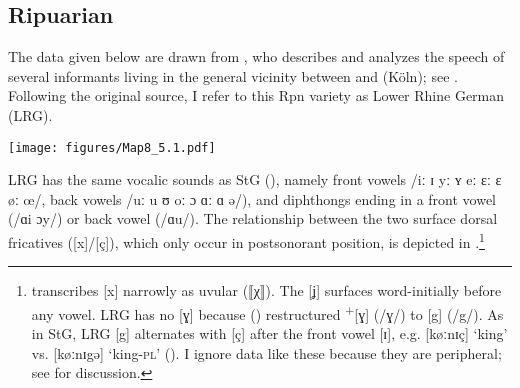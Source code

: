 \subsection{Ripuarian}\label{sec:5.3.1}

The data given below are drawn from \citet{Hall1993}, who describes and analyzes the speech of several informants living in the general vicinity between  and  (Köln); see . Following the original source, I refer to this Rpn variety as Lower Rhine German (LRG).

\begin{map}
 \centering\texttt{[image: figures/Map8\_5.1.pdf]}
 \caption[Ripuarian and Low Franconian]{Ripuarian (Rpn) and Low Franconian (LFr). Squares indicate postsonorant velar fronting and circles the absence of postsonorant velar fronting. 1=\citet{Rovenhagen1860}, 2=\citet{Wahlenberg1877},  3=\citet{Röttsches1877}, 4=\citet{Koch1879}, 5=\citet{Holthausen1885}, 6=\citet{Holthaus1887}, 7=\citet{Maurmann1889},  8=\citet{Jardon1891}, 9=\citet{Schmitz1893},  10=\citet{Müller1900}, 11=\citet{Münch1904}, 12=\citet{Hasenclever1905}, 13=\citet{Müller1912}, 14=\citet{Frings1913}, 15=\citet{Lobbes1915}, 16=\citet{Grass1920}, 17=\citet{Zeck1921},  18=\citet{Greferath1922}, 19=\citet{Mackenbach1924}, 20=\citet{Branscheid1927} (), 21=\citet{Branscheid1927} (), 22=\citet{Welter1929}, 23=\citet{Welter1933}, 24=\citet{Bubner1935}, 25=\citet{Welter1938}, 26=\citet{Heike1964}, 27=\citet{Heike1970}, 28=\citet{Jongen1972}, 29=\citet{Hecker1972}, 30=\citet{Heinrichs1978}, 31=\citet{CajotBeckers1979}, 32=\citet{Bister-Broosen1989}, 33--42=\citet{CornelissenEtAl1989} (Euskirchen (33), Dahlem (34), Monschau (35), Zülpich (36), Langerwehe (37), Nörvenich (38), Jülich (39), Bonn (40), Mönchengladbach (41), Heinsberg (42)), 43=\citet{Hinskens1992}, 44=\citet{Hall1993}, 45=\citet{Kreymann1994}, 46=\citet{Fuss2001}, 47=\citet{Ramisch1908}, 48=\citet{Meynen1911}, 49=\citet{Hanenberg1915}, 50=\citet{BethgeBonnin1969}, 51=\citet{Stiebels2013}.}
  \label{fig:5.1}\label{map:8}
\end{map}

LRG has the same vocalic sounds as StG (), namely front vowels /iː ɪ yː ʏ eː ɛː ɛ øː œ/, back vowels /uː u ʊ oː ɔ ɑː ɑ ə/), and diphthongs ending in a front vowel (/ɑi ɔy/) or back vowel (/ɑu/). The relationship between the two surface dorsal fricatives ([x]/[ç]), which only occur in postsonorant position, is depicted in .\footnote{{\citet{Hall1993} transcribes [x] narrowly as uvular (⟦χ⟧). The  [ʝ] surfaces word-initially before any vowel. LRG has no [ɣ] because  () restructured } \textrm{\textsuperscript{+}}\textrm{[ɣ] (/ɣ/) to [g] (/g/). As in StG, LRG [g] alternates with [ç] after the front vowel [ɪ], e.g. [køːnɪç] ‘king’ vs. [køːnɪgə] ‘king-\textsc{pl}’ (). I ignore data like these because they are peripheral; see  for discussion.}}\largerpage[-2]

